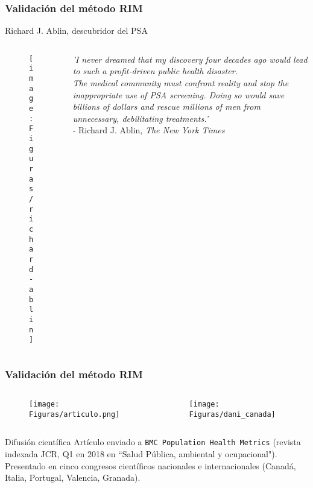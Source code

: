 \documentclass{beamer}
\begin{document}
\begin{frame}\frametitle{Validación del método RIM}

\begin{block}{Richard J. Ablin, descubridor del PSA}
	
	\begin{columns}
		\begin{column}{0.3\textwidth}
			\begin{figure}
				\centering
				\texttt{[image: Figuras/richard-ablin]}
			\end{figure}
		\end{column}
		\begin{column}{0.625\textwidth}	
			\textit{'I never dreamed that my discovery four decades ago would lead to such a profit-driven public health disaster.\\
				The medical community must confront reality and stop the inappropriate use of PSA screening. Doing so would save billions of dollars and rescue millions of men from unnecessary, debilitating treatments.'}\\[2ex]
			
			- Richard J. Ablin,  \textit{The New York Times}
		\end{column}
	\end{columns}
	
\end{block}

\end{frame}



\begin{frame}\frametitle{Validación del método RIM}

\vspace{-10pt}
\begin{columns}
	\begin{column}{0.5\textwidth}
		\begin{figure}
			\centering
			\texttt{[image: Figuras/articulo.png]}
		\end{figure}
	\end{column}
	\begin{column}{0.5\textwidth}
		\begin{figure}
			\centering
			\texttt{[image: Figuras/dani\_canada]}
		\end{figure}
	\end{column}
\end{columns}

\begin{block}{Difusión científica}
	Artículo enviado a \texttt{BMC Population Health Metrics} (revista indexada JCR, Q1 en 2018 en ``Salud Pública, ambiental y ocupacional").\\ [2ex]
	
	Presentado en cinco congresos científicos nacionales e internacionales (Canadá, Italia, Portugal, Valencia, Granada).
\end{block}

\end{frame}
\end{document}
